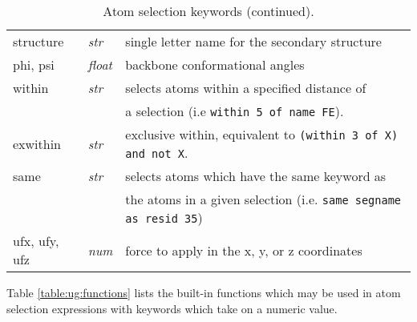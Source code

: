 \begin{table}[htb]
\begin{tabular}{|p{.9 in}| p{.4 in}| p{4.8in}| }
structure      & {\it str}   & single letter name for the secondary structure \\
phi, psi       & {\it float} & backbone conformational angles \\
within         & {\it str}   & selects atoms within a specified distance of \\
               &             & a selection (i.e {\tt within 5 of name FE}). \\
exwithin       & {\it str}   & exclusive within, equivalent to {\tt(within 3 of X) and not X}. \\
same           & {\it str}   & selects atoms which have the same keyword as \\
               &             & the atoms in a given selection (i.e. {\tt same segname as resid 35}) \\
ufx, ufy, ufz  & {\it num}   & force to apply in the x, y, or z coordinates \\
                \hline
\end{tabular}
\caption{Atom selection keywords (continued).}
\label{table:ug:keywords:cont}
\end{table}


Table \ref{table:ug:functions} lists the built-in functions which may
be used in atom selection expressions with keywords which take on a
numeric value.

